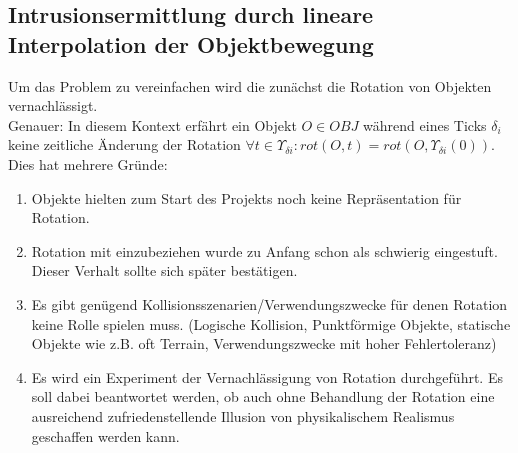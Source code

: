\subsection{Intrusionsermittlung durch lineare Interpolation der Objektbewegung}
Um das Problem zu vereinfachen wird die zunächst die Rotation von Objekten vernachlässigt.\\
Genauer: In diesem Kontext erfährt ein Objekt $O\in OBJ$ während eines Ticks $\delta_i$ keine zeitliche Änderung der Rotation $\forall t \in \Upsilon_{\delta i} : rot(O, t) = rot(O, \Upsilon_{\delta i}(0))$. Dies hat mehrere Gründe:
\begin{enumerate}
\item Objekte hielten zum Start des Projekts noch keine Repräsentation für Rotation.
\item Rotation mit einzubeziehen wurde zu Anfang schon als schwierig eingestuft. Dieser Verhalt sollte sich später bestätigen.
\item Es gibt genügend Kollisionsszenarien/Verwendungszwecke für denen Rotation keine Rolle spielen muss. (Logische Kollision, Punktförmige Objekte, statische Objekte wie z.B. oft Terrain, Verwendungszwecke mit hoher Fehlertoleranz)
\item Es wird ein Experiment der Vernachlässigung von Rotation durchgeführt. Es soll dabei beantwortet werden, ob auch ohne Behandlung der Rotation eine ausreichend zufriedenstellende Illusion von physikalischem Realismus geschaffen werden kann.
\end{enumerate}

